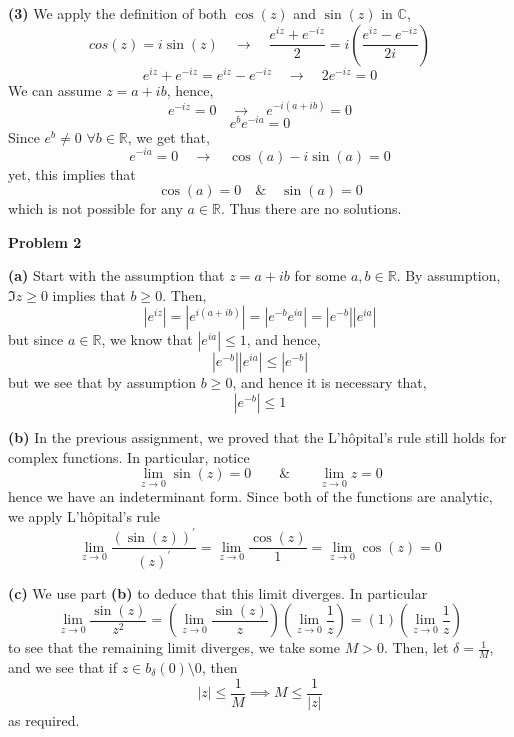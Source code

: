 \documentclass[10pt]{article}
\newcommand{\R}{\mathbb{R}}
\newcommand{\C}{\mathbb{C}}
\begin{document}
\textbf{(3)}
We apply the definition of both $\cos(z)$ and $\sin(z)$ in $\C$,
$$cos(z)=i\sin(z) \hspace{1em} \to \hspace{1em} \frac{e^{iz} + e^{-iz}}{2} = i\left(\frac{e^{iz} - e^{-iz}}{2i}\right)$$
$$e^{iz} + e^{-iz} = e^{iz} - e^{-iz} \hspace{1em} \to \hspace{1em}2e^{-iz} = 0$$
We can assume $z = a+ib$, hence,
$$e^{-iz} = 0 \hspace{1em} \to \hspace{1em} e^{-i(a +ib)} = 0$$
$$e^{b}e^{-ia} = 0$$
Since $e^{b} \neq 0$ $\forall b\in\R$, we get that,
$$e^{-ia} = 0 \hspace{1em} \to \hspace{1em} \cos(a) - i\sin(a) = 0$$
yet, this implies that
$$\cos(a) = 0 \hspace{1em} \& \hspace{1em} \sin(a) = 0$$
which is not possible for any $a \in \R$. Thus there are no solutions.

\newpage
\textbf{Problem 2}

\textbf{(a)}
Start with the assumption that $z = a +ib$ for some $a,b\in \R$. By assumption, $\Im{z} \geq 0$ implies that $b \geq 0$. Then,
$$|e^{iz}| = |e^{i(a+ib)}| = |e^{-b}e^{ia}| = |e^{-b}||e^{ia}|$$
but since $a\in \R$, we know that $|e^{ia}| \leq 1$, and hence,
$$|e^{-b}||e^{ia}| \leq |e^{-b}|$$
but we see that by assumption $b\geq 0$, and hence it is necessary that,
$$|e^{-b}| \leq 1$$

\textbf{(b)}
In the previous assignment, we proved that the L'h\^opital's rule still holds for complex functions. In particular, notice
$$\lim_{z \to 0}\sin(z) = 0 \hspace{2em} \& \hspace{2em} \lim_{z\to 0} z = 0$$
hence we have an indeterminant form. Since both of the functions are analytic, we apply L'h\^opital's rule
$$\lim_{z\to 0}\frac{(\sin(z))^{\prime}}{(z)^{\prime}} = \lim_{z\to 0} \frac{\cos(z)}{1} = \lim_{z\to 0}\cos(z) = 0$$

\textbf{(c)}
We use part \textbf{(b)} to deduce that this limit diverges. In particular
$$\lim_{z\to 0}\frac{\sin(z)}{z^{2}} = \left(\lim_{z\to 0}\frac{\sin(z)}{z}\right)\left(\lim_{z\to 0}\frac{1}{z}\right) = (1)\left(\lim_{z\to 0}\frac{1}{z}\right)$$
to see that the remaining limit diverges, we take some $M >0$. Then, let $\delta = \frac{1}{M}$, and we see that if $z\in b_{\delta}(0)\setminus 0$, then
$$|z| \leq \frac{1}{M} \implies M \leq \frac{1}{|z|}$$
as required.
\end{document}
